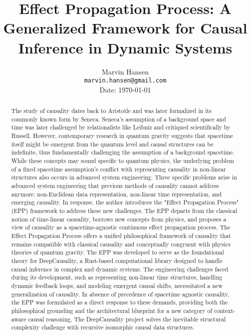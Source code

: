 \documentclass{article}
\title{Effect Propagation Process: A Generalized Framework for Causal Inference in Dynamic Systems}
\author{
  Marvin Hansen \\
  \texttt{marvin.hansen@gmail.com} \\
   Date: \today
}
\begin{document}
\maketitle

\begin{abstract}
The study of causality dates back to Aristotle and was later formalized in its commonly known form by Seneca. Seneca’s assumption of a background space and time was later challenged by relationalists like Leibniz and critiqued scientifically by Russell. However, contemporary research in quantum gravity suggests that spacetime itself might be emergent from the quantum level 
and causal structures can be indefinite, thus fundamentally challenging the assumption of a background spacetime. 
While these concepts may sound specific to quantum physics, the underlying problem of a fixed spacetime assumption's conflict with representing causality in non-linear structures also occurs in advanced system engineering. 
Three specific problems arise in advanced system engineering that previous methods of causality cannot address anymore: 
non-Euclidean data representation, non-linear time representation, and emerging causality.\newline
In response, the author introduces the "Effect Propagation Process" (EPP) framework to address these new challenges. 
The EPP departs from the classical notion of time-linear causality, borrows new concepts from physics, and proposes 
a view of  causality as a spacetime-agnostic continuous effect propagation process. The Effect Propagation Process offers 
a unified philosophical framework of causality that remains compatible with classical causality and conceptually congruent 
with physics theories of quantum gravity.\newline
The EPP was developed to serve as the foundational theory for DeepCausality, a Rust-based computational library designed 
to handle causal inference in complex and dynamic systems. The engineering challenges faced during its development, 
such as representing non-linear time structures, handling dynamic feedback loops, and modeling emergent causal shifts, 
necessitated a new generalization of causality. In absence of precedence of spacetime agnostic causality, 
the EPP was formulated as a direct response to these demands, providing both the philosophical grounding and the 
architectural blueprint for a new category of context-aware causal reasoning. The DeepCausality project solves 
the inevitable structural complexity challenge with recursive isomorphic causal data structures.\newline

\end{abstract}
\end{document}
